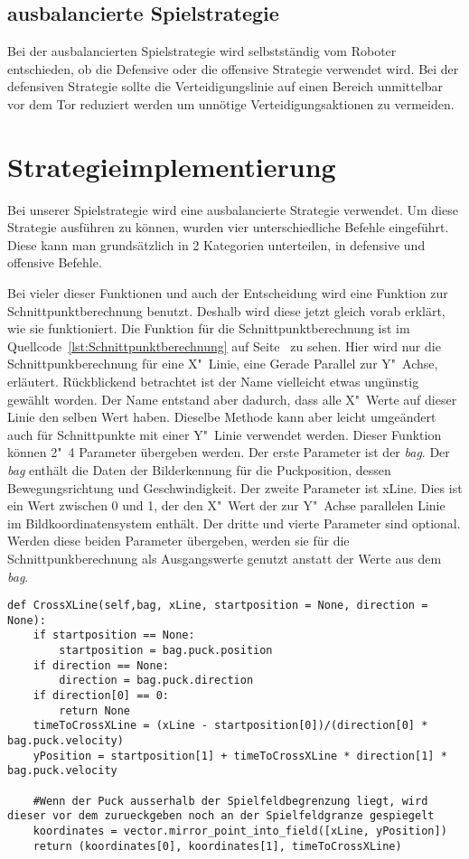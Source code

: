 \subsection{ausbalancierte Spielstrategie}
Bei der ausbalancierten Spielstrategie wird selbstständig vom Roboter entschieden, ob die Defensive oder die offensive Strategie verwendet wird. Bei der defensiven Strategie sollte die Verteidigungslinie auf einen Bereich unmittelbar vor dem Tor reduziert werden um unnötige Verteidigungsaktionen zu vermeiden.

\section{Strategieimplementierung}

Bei unserer Spielstrategie wird eine ausbalancierte Strategie verwendet. Um diese Strategie ausführen zu können, wurden vier unterschiedliche Befehle eingeführt. Diese kann man grundsätzlich in 2 Kategorien unterteilen, in defensive und offensive Befehle. 

Bei vieler dieser Funktionen und auch der Entscheidung wird eine Funktion zur Schnittpunktberechnung benutzt. Deshalb wird diese jetzt gleich vorab erklärt, wie sie funktioniert. Die Funktion für die Schnittpunktberechnung ist  im Quellcode~\ref{lst:Schnittpunktberechnung} auf Seite~\pageref{lst:Schnittpunktberechnung} zu sehen. Hier wird nur die Schnittpunkberechnung für eine X"~Linie, eine Gerade Parallel zur Y"~Achse, erläutert. Rückblickend betrachtet ist der Name vielleicht etwas ungünstig gewählt worden. Der Name entstand aber dadurch, dass alle X"~Werte auf dieser Linie den selben Wert haben.
Dieselbe Methode kann aber leicht umgeändert auch für Schnittpunkte mit einer Y"~Linie verwendet werden. Dieser Funktion können 2"~4 Parameter übergeben werden. Der erste Parameter ist der \textit{bag}. Der \textit{bag} enthält die Daten der Bilderkennung für die Puckposition, dessen Bewegungsrichtung und Geschwindigkeit. Der zweite Parameter ist xLine. Dies ist ein Wert zwischen 0 und 1, der den X"~Wert der zur Y"~Achse parallelen Linie im Bildkoordinatensystem enthält. Der dritte und vierte Parameter sind optional. Werden diese beiden Parameter übergeben, werden sie für die Schnittpunkberechnung als Ausgangswerte genutzt anstatt der Werte aus dem \textit{bag}. 

\begin{lstlisting}[caption= Python-Funktion für Schnittpunktberechnung, label=lst:Schnittpunktberechnung]
def CrossXLine(self,bag, xLine, startposition = None, direction = None):     
	if startposition == None:
		startposition = bag.puck.position
	if direction == None:
		direction = bag.puck.direction
	if direction[0] == 0:
		return None
	timeToCrossXLine = (xLine - startposition[0])/(direction[0] * bag.puck.velocity)
	yPosition = startposition[1] + timeToCrossXLine * direction[1] * bag.puck.velocity
	
	#Wenn der Puck ausserhalb der Spielfeldbegrenzung liegt, wird dieser vor dem zurueckgeben noch an der Spielfeldgranze gespiegelt
	koordinates = vector.mirror_point_into_field([xLine, yPosition])
	return (koordinates[0], koordinates[1], timeToCrossXLine)
\end{lstlisting}


